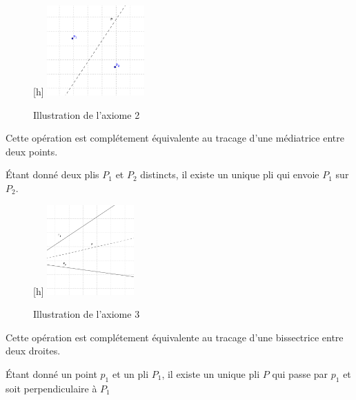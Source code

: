 \documentclass[a4paper,12pt,french]{report}
\begin{document}
		\begin{figure}
		    \begin{center}[h]
			\includegraphics[height=130px]{media/Ax2.eps}
		    \end{center}
			\caption{Illustration de l'axiome 2}
		\end{figure}
		
		Cette opération est complétement équivalente au tracage d'une médiatrice entre deux points.
		\begin{axiome}
			Étant donné deux plis $P_{1}$ et $P_{2}$ distincts, il existe un unique pli qui envoie $P_{1}$ sur $P_{2}$.
		\end{axiome}
		
		\begin{figure}
		    \begin{center}[h]
			\includegraphics[height=130px]{media/Ax3.eps}
		    \end{center}
			\caption{Illustration de l'axiome 3}
		\end{figure}
		
		Cette opération est complétement équivalente au tracage d'une bissectrice entre deux droites.
		\begin{axiome}
			Étant donné un point $p_{1}$ et un pli $P_{1}$, il existe un unique pli $P$ qui passe par $p_{1}$ et soit perpendiculaire à $P_{1}$
		\end{axiome}
		
\end{document}

